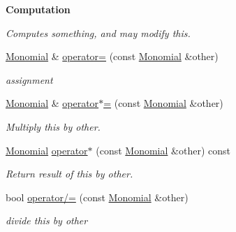 \begin{Indent}\textbf{ Computation}\par
{\em Computes something, and may modify {\ttfamily this}. }\begin{DoxyCompactItemize}
\item 
\mbox{\label{group__polygroup_a031963d851198221d949d84fb32af907}} 
\hyperlink{group__polygroup_class_monomial}{Monomial} \& \hyperlink{group__polygroup_a031963d851198221d949d84fb32af907}{operator=} (const \hyperlink{group__polygroup_class_monomial}{Monomial} \&other)
\begin{DoxyCompactList}\small\item\em assignment \end{DoxyCompactList}\item 
\mbox{\label{group__polygroup_ad69e9257c8afdab1adeeebff3d9bd87f}} 
\hyperlink{group__polygroup_class_monomial}{Monomial} \& \hyperlink{group__polygroup_ad69e9257c8afdab1adeeebff3d9bd87f}{operator$\ast$=} (const \hyperlink{group__polygroup_class_monomial}{Monomial} \&other)
\begin{DoxyCompactList}\small\item\em Multiply {\ttfamily this} by {\ttfamily other}. \end{DoxyCompactList}\item 
\mbox{\label{group__polygroup_a12f23777300868c735ce6f83868a5cce}} 
\hyperlink{group__polygroup_class_monomial}{Monomial} \hyperlink{group__polygroup_a12f23777300868c735ce6f83868a5cce}{operator$\ast$} (const \hyperlink{group__polygroup_class_monomial}{Monomial} \&other) const
\begin{DoxyCompactList}\small\item\em Return result of {\ttfamily this} by {\ttfamily other}. \end{DoxyCompactList}\item 
bool \hyperlink{group__polygroup_a764a69f76747cf8f5f58ef6473028204}{operator/=} (const \hyperlink{group__polygroup_class_monomial}{Monomial} \&other)
\begin{DoxyCompactList}\small\item\em divide {\ttfamily this} by {\ttfamily other} \end{DoxyCompactList}\item 
\mbox{\label{group__polygroup_a168381ee5e477d90f59dec9f26b24cc6}} 

\end{DoxyCompactItemize}
\end{Indent}

